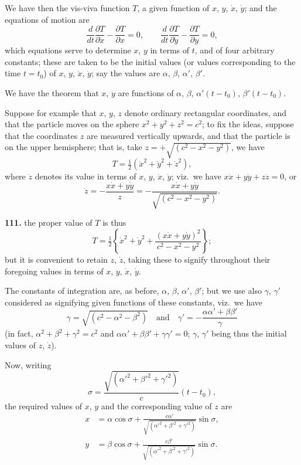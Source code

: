 \documentclass[11pt,a4paper]{book}
\begin{document}
We have then the vis-viva function $T$, a given function of $x$, $y$, $\dot{x}$, $\dot{y}$; and the equations of motion are
\[
\frac{d}{dt}\frac{\partial T}{\partial \dot{x}} - \frac{\partial T}{\partial x} = 0, \qquad
\frac{d}{dt}\frac{\partial T}{\partial \dot{y}} - \frac{\partial T}{\partial y} = 0,
\]
which equations serve to determine $x$, $y$ in terms of $t$, and of four arbitrary constants; these are taken to be the initial values (or values corresponding to the time $t = t_0$) of $x$, $y$, $\dot{x}$, $\dot{y}$; say the values are $\alpha$, $\beta$, $\alpha'$, $\beta'$.

We have the theorem that $x$, $y$ are functions of $\alpha$, $\beta$, $\alpha'(t - t_0)$, $\beta'(t - t_0)$.

Suppose for example that $x$, $y$, $z$ denote ordinary rectangular coordinates, and that the particle moves on the sphere $x^2 + y^2 + z^2 = c^2$; to fix the ideas, suppose that the coordinates $z$ are measured vertically upwards, and that the particle is on the upper hemisphere; that is, take $z = +\sqrt{(c^2 - x^2 - y^2)}$, we have
\[
T = \tfrac{1}{2}(\dot{x}^2 + \dot{y}^2 + \dot{z}^2),
\]
where $\dot{z}$ denotes its value in terms of $x$, $y$, $\dot{x}$, $\dot{y}$; viz.\ we have $x\dot{x} + y\dot{y} + z\dot{z} = 0$, or
\[
\dot{z} = -\frac{x\dot{x} + y\dot{y}}{z} = -\frac{x\dot{x} + y\dot{y}}{\sqrt{(c^2 - x^2 - y^2)}}.
\]


\noindent\textbf{111.} the proper value of $T$ is thus
\[
T = \tfrac{1}{2}\left\{\dot{x}^2 + \dot{y}^2 + \frac{(x\dot{x} + y\dot{y})^2}{c^2 - x^2 - y^2}\right\};
\]
but it is convenient to retain $z$, $\dot{z}$, taking these to signify throughout their foregoing values in terms of $x$, $y$, $\dot{x}$, $\dot{y}$.

The constants of integration are, as before, $\alpha$, $\beta$, $\alpha'$, $\beta'$; but we use also $\gamma$, $\gamma'$ considered as signifying given functions of these constants, viz.\ we have
\[
\gamma = \sqrt{(c^2 - \alpha^2 - \beta^2)} \quad \text{and} \quad \gamma' = -\frac{\alpha\alpha' + \beta\beta'}{\gamma}
\]
(in fact, $\alpha^2 + \beta^2 + \gamma^2 = c^2$ and $\alpha\alpha' + \beta\beta' + \gamma\gamma' = 0$; $\gamma$, $\gamma'$ being thus the initial values of $z$, $\dot{z}$).

Now, writing
\[
\sigma = \frac{\sqrt{(\alpha'^2 + \beta'^2 + \gamma'^2)}}{c}(t - t_0),
\]
the required values of $x$, $y$ and the corresponding value of $z$ are
\begin{align*}
x &= \alpha\cos\sigma + \frac{c\alpha'}{\sqrt{(\alpha'^2 + \beta'^2 + \gamma'^2)}}\sin\sigma, \\
y &= \beta\cos\sigma + \frac{c\beta'}{\sqrt{(\alpha'^2 + \beta'^2 + \gamma'^2)}}\sin\sigma.
\end{align*}
\end{document}
